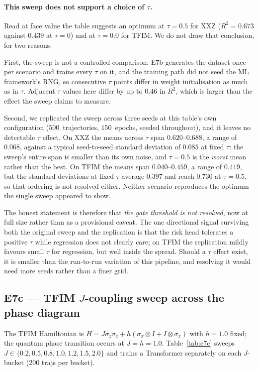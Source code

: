 \documentclass[twocolumn,10pt]{article}
\begin{document}
\paragraph{This sweep does not support a choice of $\tau$.}
Read at face value the table suggests an optimum at $\tau=0.5$ for XXZ
($R^2=0.673$ against $0.439$ at $\tau=0$) and at $\tau=0.0$ for TFIM.
We do not draw that conclusion, for two reasons.

First, the sweep is not a controlled comparison: E7b generates the
dataset once per scenario and trains every $\tau$ on it, and the
training path did not seed the ML framework's RNG, so consecutive
$\tau$ points differ in weight initialisation as much as in $\tau$.
Adjacent $\tau$ values here differ by up to $0.46$ in $R^2$, which is
larger than the effect the sweep claims to measure.

Second, we replicated the sweep across three seeds at this table's own
configuration ($500$~trajectories, $150$~epochs, seeded throughout), and
it leaves no detectable $\tau$ effect.
On XXZ the means across $\tau$ span $0.620$--$0.688$, a range of
$0.068$, against a typical seed-to-seed standard deviation of $0.085$
at fixed $\tau$: the sweep's entire span is smaller than its own noise,
and $\tau=0.5$ is the \emph{worst} mean rather than the best.
On TFIM the means span $0.040$--$0.459$, a range of $0.419$, but the
standard deviations at fixed $\tau$ average $0.397$ and reach $0.730$
at $\tau=0.5$, so that ordering is not resolved either.
Neither scenario reproduces the optimum the single sweep appeared to
show.

The honest statement is therefore that \emph{the gate threshold is not
resolved}, now at full size rather than as a provisional caveat.
The one directional signal surviving both the original sweep and the
replication is that the risk head tolerates a positive $\tau$ while
regression does not clearly care; on TFIM the replication mildly favours
small $\tau$ for regression, but well inside the spread.
Should a $\tau$ effect exist, it is smaller than the run-to-run
variation of this pipeline, and resolving it would need more seeds
rather than a finer grid.

\subsection{E7c --- TFIM $J$-coupling sweep across the phase diagram}
\label{sec:e7c}

The TFIM Hamiltonian is $H = J\sigma_z\sigma_z + h(\sigma_x \otimes I +
I \otimes \sigma_x)$ with $h = 1.0$ fixed; the quantum phase transition
occurs at $J = h = 1.0$.
Table~\ref{tab:e7c} sweeps $J \in \{0.2, 0.5, 0.8, 1.0, 1.2, 1.5,
2.0\}$ and trains a Transformer separately on each $J$-bucket (200
trajs per bucket).
\end{document}
